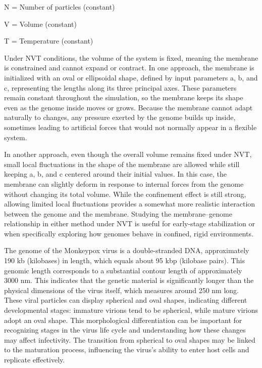 \documentclass[12pt]{article}
\begin{document}
\begin{flushleft}
    N = Number of particles (constant)

    V = Volume (constant)

    T = Temperature (constant)

Under NVT conditions, the volume of the system is fixed, meaning the membrane is constrained and cannot expand or contract. In one approach, the membrane is initialized with an oval or ellipsoidal shape, defined by input parameters a, b, and c, representing the lengths along its three principal axes. These parameters remain constant throughout the simulation, so the membrane keeps its shape even as the genome inside moves or grows. Because the membrane cannot adapt naturally to changes, any pressure exerted by the genome builds up inside, sometimes leading to artificial forces that would not normally appear in a flexible system.

In another approach, even though the overall volume remains fixed under NVT, small local fluctuations in the shape of the membrane are allowed while still keeping a, b, and c centered around their initial values. In this case, the membrane can slightly deform in response to internal forces from the genome without changing its total volume. While the confinement effect is still strong, allowing limited local fluctuations provides a somewhat more realistic interaction between the genome and the membrane. Studying the membrane–genome relationship in either method under NVT is useful for early-stage stabilization or when specifically exploring how genomes behave in confined, rigid environments.



The genome of the Monkeypox virus is a double-stranded DNA, approximately 190 kb (kilobases) in length, which equals about 95 kbp (kilobase pairs). This genomic length corresponds to a substantial contour length of approximately 3000 nm. This indicates that the genetic material is significantly longer than the physical dimensions of the virus itself, which measures around 250 nm long. 
These viral particles can display spherical and oval shapes, indicating different developmental stages: immature virions tend to be spherical, while mature virions adopt an oval shape. This morphological differentiation can be important for recognizing stages in the virus life cycle and understanding how these changes may affect infectivity. The transition from spherical to oval shapes may be linked to the maturation process, influencing the virus's ability to enter host cells and replicate effectively.\\


\end{flushleft}
\end{document}
